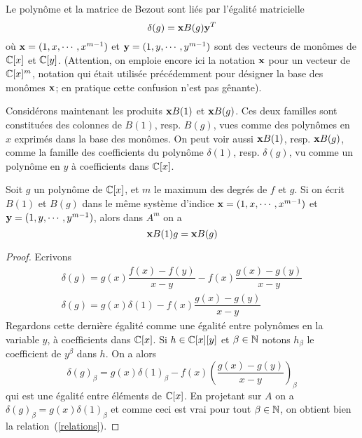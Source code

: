 \documentclass{standalone}
\begin{document}
\begin{rem}
Le polynôme et la matrice de Bezout sont liés par l'égalité matricielle
\begin{equation}
	\label{pmB}
	\delta(g) = \bold{x} B(g) \bold{y}^T
\end{equation}
où $\bold{x} = (1, x,\cdots, x^{m-1})$ et $\bold{y} = (1, y,\cdots, y^{m-1})$ sont des vecteurs de monômes de $\mathbb{C}[x]$ et $\mathbb{C}[y]$. (Attention, on emploie encore ici la notation ${\bold x}$ pour un vecteur de $\mathbb{C}[x]^m$, notation qui était utilisée précédemment pour désigner la base des monômes ${\bold x}$; en pratique cette confusion n'est pas gênante).
\end{rem}
Considérons maintenant les produits $\bold{x}B(1)$ et $\bold{x}B(g)$. Ces deux familles sont constituées des colonnes de $B(1)$, resp. $B(g)$, vues comme des polynômes en $x$ exprimés dans la base des monômes. On peut voir aussi $\bold{x}B(1)$, resp. $\bold{x}B(g)$, comme la famille des coefficients du polynôme $\delta(1)$, resp. $\delta(g)$, vu comme un polynôme en $y$ à coefficients dans $\mathbb{C}[x]$.


\begin{prop}
\label{relations_prop}
Soit $g$ un polynôme de $\mathbb{C}[x]$, et $m$ le maximum des degrés de $f$ et $g$. Si on écrit $B(1)$ et $B(g)$ dans le même système d'indice $\bold{x} = (1, x,\cdots, x^{m-1})$ et $\bold{y} = (1, y,\cdots, y^{m-1})$, alors dans $A^m$ on a
\begin{equation}
\label{relations}
	\bold{x}B(1)g = \bold{x}B(g)
\end{equation}
\end{prop}
\begin{proof}
Ecrivons
\begin{align} \nonumber
	\delta(g) = g(x)\dfrac{f(x)-f(y)}{x-y} - f(x)\dfrac{g(x)-g(y)}{x-y} \\ \nonumber
	\delta(g) = g(x)\delta(1) - f(x)\dfrac{g(x)-g(y)}{x-y}
\end{align}
Regardons cette dernière égalité comme une égalité entre polynômes en la variable $y$, à coefficients dans $\mathbb{C}[x]$. Si $h\in \mathbb{C}[x][y]$ et $\beta\in\mathbb{N}$ notons $h_\beta$ le coefficient de $y^\beta$ dans $h$. On a alors
$$\delta(g)_\beta = g(x)\delta(1)_\beta - f(x)(\dfrac{g(x)-g(y)}{x-y})_\beta $$
qui est une égalité entre éléments de $\mathbb{C}[x]$. En projetant sur $A$ on a
$\delta(g)_\beta = g(x)\delta(1)_\beta$
et comme ceci est vrai pour tout $\beta\in\mathbb{N}$, on obtient bien la relation~(\ref{relations}).
\end{proof}
\end{document}
